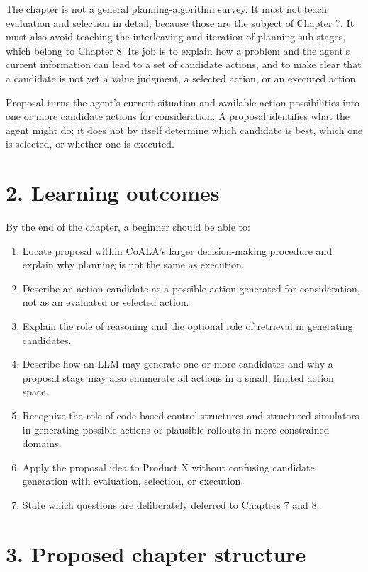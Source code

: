 The chapter is not a general planning-algorithm survey. It must not teach evaluation and selection in detail, because those are the subject of Chapter 7. It must also avoid teaching the interleaving and iteration of planning sub-stages, which belong to Chapter 8. Its job is to explain how a problem and the agent's current information can lead to a set of candidate actions, and to make clear that a candidate is not yet a value judgment, a selected action, or an executed action.

\begin{takeawaybox}
Proposal turns the agent's current situation and available action possibilities into one or more candidate actions for consideration. A proposal identifies what the agent might do; it does not by itself determine which candidate is best, which one is selected, or whether one is executed.
\end{takeawaybox}

\section*{2. Learning outcomes}
By the end of the chapter, a beginner should be able to:
\begin{enumerate}
  \item Locate proposal within CoALA's larger decision-making procedure and explain why planning is not the same as execution.
  \item Describe an action candidate as a possible action generated for consideration, not as an evaluated or selected action.
  \item Explain the role of reasoning and the optional role of retrieval in generating candidates.
  \item Describe how an LLM may generate one or more candidates and why a proposal stage may also enumerate all actions in a small, limited action space.
  \item Recognize the role of code-based control structures and structured simulators in generating possible actions or plausible rollouts in more constrained domains.
  \item Apply the proposal idea to Product X without confusing candidate generation with evaluation, selection, or execution.
  \item State which questions are deliberately deferred to Chapters 7 and 8.
\end{enumerate}

\section*{3. Proposed chapter structure}
\setcounter{chapter}{6}

